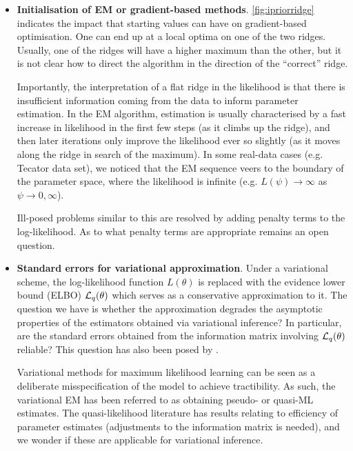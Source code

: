 \documentclass[11pt,twoside,openright]{report}
\begin{document}
\begin{itemize}
  \item \textbf{Initialisation of EM or gradient-based methods}.
  \cref{fig:ipriorridge}  indicates the impact that starting values can have on gradient-based optimisation.
  One can end up at a local optima on one of the two ridges.
  Usually, one of the ridges will have a higher maximum than the other, but it is not clear how to direct the algorithm in the direction of the ``correct'' ridge.
  
  Importantly, the interpretation of a flat ridge in the likelihood is that there is insufficient information coming  from the data to inform parameter estimation.
  In the EM algorithm, estimation is usually characterised by a fast increase in likelihood in the first few steps (as it climbs up the ridge), and then later iterations only improve the likelihood ever so slightly (as it moves along the ridge in search of the maximum).
  In some real-data cases (e.g. Tecator data set), we noticed that the EM sequence veers to the boundary of the parameter space, where the likelihood is infinite (e.g. $L(\psi) \to \infty$ as $\psi\to 0,\infty$).
  
  Ill-posed problems similar to this are resolved by adding penalty terms to the log-likelihood.
  As to what penalty terms are appropriate remains an open question.
  
  \item \textbf{Standard errors for variational approximation}. 
  Under a variational scheme, the log-likelihood function $L(\theta)$ is replaced with the evidence lower bound (ELBO) ${\mathcal L}_q(\theta)$ which serves as a  conservative approximation to it. 
  The question we have is whether the approximation degrades the asymptotic properties of the estimators obtained via variational inference?
  In particular, are the standard errors obtained from the information matrix involving ${\mathcal L}_q(\theta)$ reliable?
  This question has also been posed by \citet{hall2011asymptotic,bickel2013asymptotic,chen2017use}.
  
  Variational methods for maximum likelihood learning can be seen as a deliberate misspecification of the model to achieve tractibility. 
  As such, the variational EM has been referred to as obtaining pseudo- or quasi-ML estimates.
  The quasi-likelihood literature has results relating to efficiency of parameter estimates (adjustments to the information matrix is needed), and we wonder if these are applicable for variational inference.
  

\end{itemize}
\end{document}
